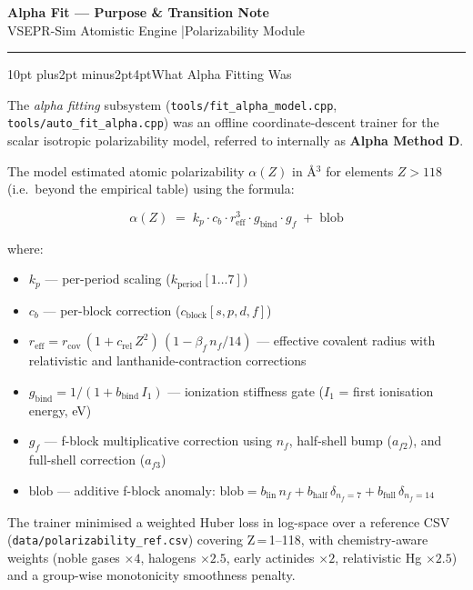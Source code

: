 \documentclass[11pt, a4paper]{article}
\makeatletter
\renewcommand{\section}{\@startsection{section}{1}{\z@}%
  {10pt plus2pt minus2pt}{4pt}{\large\bfseries}}
\makeatother
\begin{document}
\begin{center}
{\Large\bfseries Alpha Fit --- Purpose \& Transition Note}\\[4pt]
{\small VSEPR-Sim Atomistic Engine \quad|\quad Polarizability Module}
\end{center}
\vspace{-0.4em}\hrule\vspace{0.6em}

\section{What Alpha Fitting Was}

The \textit{alpha fitting} subsystem
(\texttt{tools/fit\_alpha\_model.cpp}, \texttt{tools/auto\_fit\_alpha.cpp})
was an offline coordinate-descent trainer for the scalar isotropic
polarizability model, referred to internally as \textbf{Alpha Method D}.

The model estimated atomic polarizability $\alpha(Z)$ in \AA$^3$ for
elements $Z > 118$ (i.e.\ beyond the empirical table) using the formula:

\[
\alpha(Z) \;=\; k_p \cdot c_b \cdot r_\text{eff}^3 \cdot g_\text{bind}
             \cdot g_f \;+\; \text{blob}
\]

\noindent where:

\begin{itemize}
  \item $k_p$ --- per-period scaling ($k_\text{period}[1\ldots7]$)
  \item $c_b$ --- per-block correction ($c_\text{block}[s,p,d,f]$)
  \item $r_\text{eff} = r_\text{cov}\,(1 + c_\text{rel}\,Z^2)\,
        (1 - \beta_f\,n_f/14)$ --- effective covalent radius with
        relativistic and lanthanide-contraction corrections
  \item $g_\text{bind} = 1/(1 + b_\text{bind}\,I_1)$ --- ionization
        stiffness gate ($I_1$ = first ionisation energy, eV)
  \item $g_f$ --- f-block multiplicative correction using
        $n_f$, half-shell bump ($a_{f2}$), and full-shell correction ($a_{f3}$)
  \item $\text{blob}$ --- additive f-block anomaly:
        $\text{blob} = b_\text{lin}\,n_f + b_\text{half}\,\delta_{n_f=7}
         + b_\text{full}\,\delta_{n_f=14}$
\end{itemize}

The trainer minimised a weighted Huber loss in log-space over a reference CSV
(\texttt{data/polarizability\_ref.csv}) covering Z\,=\,1--118, with
chemistry-aware weights (noble gases $\times 4$, halogens $\times 2.5$,
early actinides $\times 2$, relativistic Hg $\times 2.5$) and a
group-wise monotonicity smoothness penalty.
\end{document}
